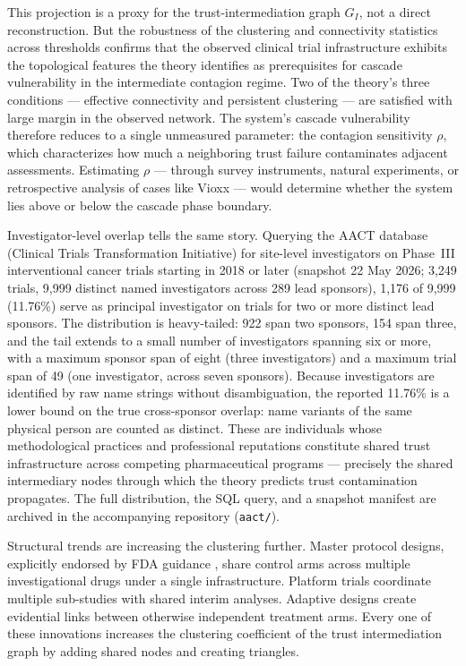 \documentclass[11pt,a4paper]{article}
\begin{document}
This projection is a proxy for the trust-intermediation graph $G_I$, not a direct reconstruction. But the robustness of the clustering and connectivity statistics across thresholds confirms that the observed clinical trial infrastructure exhibits the topological features the theory identifies as prerequisites for cascade vulnerability in the intermediate contagion regime. Two of the theory's three conditions --- effective connectivity and persistent clustering --- are satisfied with large margin in the observed network. The system's cascade vulnerability therefore reduces to a single unmeasured parameter: the contagion sensitivity $\rho$, which characterizes how much a neighboring trust failure contaminates adjacent assessments. Estimating $\rho$ --- through survey instruments, natural experiments, or retrospective analysis of cases like Vioxx \cite{topol2004} --- would determine whether the system lies above or below the cascade phase boundary.

Investigator-level overlap tells the same story. Querying the AACT database (Clinical Trials Transformation Initiative) for site-level investigators on Phase~III interventional cancer trials starting in 2018 or later (snapshot 22 May 2026; 3{,}249 trials, 9{,}999 distinct named investigators across 289 lead sponsors), 1{,}176 of 9{,}999 (11.76\%) serve as principal investigator on trials for two or more distinct lead sponsors. The distribution is heavy-tailed: 922 span two sponsors, 154 span three, and the tail extends to a small number of investigators spanning six or more, with a maximum sponsor span of eight (three investigators) and a maximum trial span of 49 (one investigator, across seven sponsors). Because investigators are identified by raw name strings without disambiguation, the reported 11.76\% is a lower bound on the true cross-sponsor overlap: name variants of the same physical person are counted as distinct. These are individuals whose methodological practices and professional reputations constitute shared trust infrastructure across competing pharmaceutical programs --- precisely the shared intermediary nodes through which the theory predicts trust contamination propagates. The full distribution, the SQL query, and a snapshot manifest are archived in the accompanying repository (\texttt{aact/}).

Structural trends are increasing the clustering further. Master protocol designs, explicitly endorsed by FDA guidance \cite{fda2022,fda2023}, share control arms across multiple investigational drugs under a single infrastructure. Platform trials coordinate multiple sub-studies with shared interim analyses. Adaptive designs create evidential links between otherwise independent treatment arms. Every one of these innovations increases the clustering coefficient of the trust intermediation graph by adding shared nodes and creating triangles.
\end{document}
